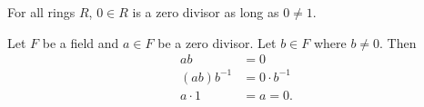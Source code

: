 \begin{example}
    For all rings $R$, $0 \in R$ is a zero divisor as long as $0 \neq 1$.
\end{example}

\begin{example}
    Let $F$ be a field and $a \in F$ be a zero divisor. Let $b \in F$ where $b \neq 0$. Then
    \begin{align*}
        ab &= 0 \\
        (ab)b^{-1} &= 0 \cdot b^{-1} \\
        a \cdot 1 &= a = 0.
    \end{align*}
\end{example}
